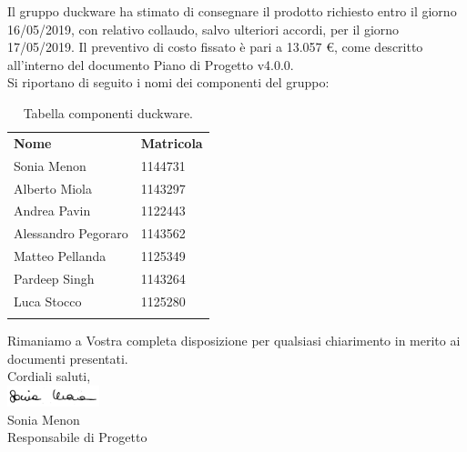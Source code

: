 \documentclass[a4paper,12pt]{article}
\begin{document}
Il gruppo duckware ha stimato di consegnare il prodotto richiesto entro il giorno 16/05/2019, con relativo collaudo, salvo ulteriori accordi, per il giorno 17/05/2019. Il preventivo di costo fissato è pari a 13.057 \euro, come descritto all’interno del documento Piano di Progetto v4.0.0.\\[0.5cm]
Si riportano di seguito i nomi dei componenti del gruppo:
\begin{center}
	\renewcommand{\arraystretch}{1.5}
	\begin{longtable}{  p{4cm}  p{2cm}  }
		\rowcolor{tableHeadYellow}
		\textbf{Nome}   & \textbf{Matricola} \\
		Sonia Menon & 1144731\\
		Alberto Miola & 1143297\\
		Andrea Pavin & 1122443\\
		Alessandro Pegoraro & 1143562\\
		Matteo Pellanda & 1125349\\
		Pardeep Singh & 1143264\\
		Luca Stocco & 1125280\\
		\rowcolor{white}
		\caption{Tabella componenti duckware.}
	\end{longtable}
\end{center}
Rimaniamo a Vostra completa disposizione per qualsiasi chiarimento in merito ai documenti presentati.\\[1.5cm]
Cordiali saluti,\\
\includegraphics[width=0.2\textwidth]{../images/firme/firma_sonia.png}\\
Sonia Menon\\
Responsabile di Progetto
\vfill
\end{document}
